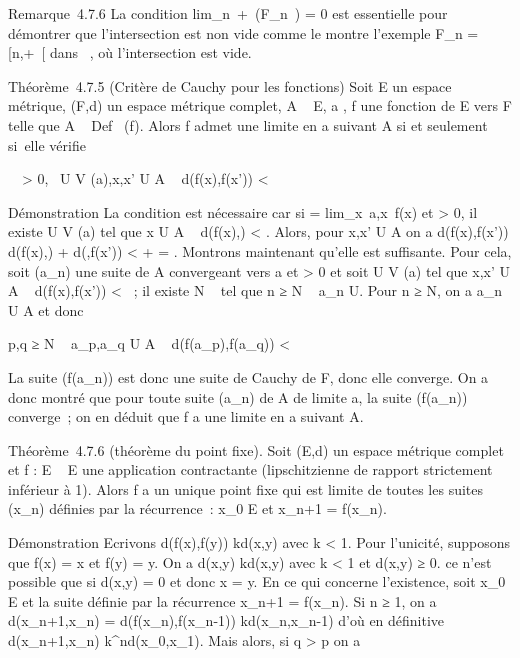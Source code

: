 \documentclass[]{article}
\begin{document}
Remarque~4.7.6 La condition
lim\_n\rightarrow~+\infty~\delta(F\_n~) = 0 est
essentielle pour démontrer que l'intersection est non vide comme le
montre l'exemple F\_n = {[}n,+\infty~{[} dans ~, où l'intersection est
vide.

Théorème~4.7.5 (Critère de Cauchy pour les fonctions) Soit E un espace
métrique, (F,d) un espace métrique complet, A \subset~ E, a
\in\overlineA, f une fonction de E vers F telle que A
\subset~ Def~ (f). Alors f admet une limite en a
suivant A si et seulement si~elle vérifie

\forall~~\epsilon \textgreater{} 0,
\exists~U \in V (a),\quad x,x' \in U \bigcap A \rigtharrow~
d(f(x),f(x')) \textless{} \epsilon

Démonstration La condition est nécessaire car si \ell
= lim\_x\rightarrow~a,x\inA~f(x) et \epsilon \textgreater{}
0, il existe U \in V (a) tel que x \in U \bigcap A \rigtharrow~ d(f(x),\ell) \textless{} \epsilon{}.
Alors, pour x,x' \in U \bigcap A on a d(f(x),f(x')) \leq d(f(x),\ell) + d(\ell,f(x'))
\textless{} \epsilon{} + \epsilon{} = \epsilon. Montrons maintenant qu'elle est suffisante.
Pour cela, soit (a\_n) une suite de A convergeant vers a et \epsilon
\textgreater{} 0 et soit U \in V (a) tel que x,x' \in U \bigcap A \rigtharrow~ d(f(x),f(x'))
\textless{} \epsilon~; il existe N \in {}~ tel que n ≥ N \rigtharrow~ a\_n \in U. Pour n
≥ N, on a a\_n \in U \bigcap A et donc

p,q ≥ N \rigtharrow~ a\_p,a\_q \in U \bigcap A \rigtharrow~
d(f(a\_p),f(a\_q)) \textless{} \epsilon

La suite (f(a\_n)) est donc une suite de Cauchy de F, donc elle
converge. On a donc montré que pour toute suite (a\_n) de A de
limite a, la suite (f(a\_n)) converge~; on en déduit que f a une
limite en a suivant A.

Théorème~4.7.6 (théorème du point fixe). Soit (E,d) un espace métrique
complet et f : E \rightarrow~ E une application contractante (lipschitzienne de
rapport strictement inférieur à 1). Alors f a un unique point fixe qui
est limite de toutes les suites (x\_n) définies par la
récurrence~: x\_0 \in E et x\_n+1 = f(x\_n).

Démonstration Ecrivons d(f(x),f(y)) \leq kd(x,y) avec k \textless{} 1. Pour
l'unicité, supposons que f(x) = x et f(y) = y. On a d(x,y) \leq kd(x,y)
avec k \textless{} 1 et d(x,y) ≥ 0. ce n'est possible que si d(x,y) = 0
et donc x = y. En ce qui concerne l'existence, soit x\_0 \in E et
la suite définie par la récurrence x\_n+1 = f(x\_n). Si
n ≥ 1, on a d(x\_n+1,x\_n) =
d(f(x\_n),f(x\_n-1)) \leq kd(x\_n,x\_n-1)
d'où en définitive d(x\_n+1,x\_n) \leq
k^nd(x\_0,x\_1). Mais alors, si q
\textgreater{} p on a
\end{document}
